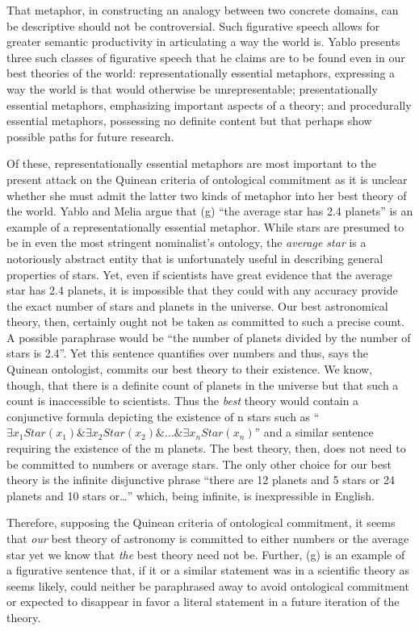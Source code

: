 \documentclass[12pt,letterpaper]{article}
\begin{document}
\begin{doublespace}
That metaphor, in constructing an analogy between two concrete
domains, can be descriptive should not be controversial.  Such
figurative speech allows for greater semantic productivity in
articulating a way the world is. Yablo presents three such classes of
figurative speech that he claims are to be found even in our best
theories of the world: representationally essential metaphors,
expressing a way the world is that would otherwise be unrepresentable;
presentationally essential metaphors, emphasizing important aspects of
a theory; and procedurally essential metaphors, possessing no definite
content but that perhaps show possible paths for future research.

Of these, representationally essential metaphors are most important to
the present attack on the Quinean criteria of ontological commitment
as it is unclear whether she must admit the latter two kinds of
metaphor into her best theory of the world.  Yablo and Melia argue
that (g) ``the average star has 2.4 planets'' is an example of a
representationally essential metaphor.  While stars are presumed to be
in even the most stringent nominalist's ontology, the \emph{average
  star} is a notoriously abstract entity that is unfortunately useful
in describing general properties of stars.  Yet, even if scientists
have great evidence that the average star has 2.4 planets, it is
impossible that they could with any accuracy provide the exact number
of stars and planets in the universe. Our best astronomical theory,
then, certainly ought not be taken as committed to such a precise
count. A possible paraphrase would be ``the number of planets divided
by the number of stars is 2.4''.  Yet this sentence quantifies over
numbers and thus, says the Quinean ontologist, commits our best theory
to their existence.  We know, though, that there is a definite count
of planets in the universe but that such a count is inaccessible to
scientists. Thus the \emph{best} theory would contain a conjunctive
formula depicting the existence of n stars such as ``$\exists
x_1Star(x_1) \& \exists x_2Star(x_2) \& \ldots \& \exists
x_nStar(x_n)$'' and a similar sentence requiring the existence of the
m planets. The best theory, then, does not need to be committed to
numbers or average stars.  The only other choice for our best theory
is the infinite disjunctive phrase ``there are 12 planets and 5 stars
or 24 planets and 10 stars or\ldots'' which, being infinite, is
inexpressible in English.  

Therefore, supposing the Quinean criteria of ontological commitment,
it seems that \emph{our} best theory of astronomy is committed to
either numbers or the average star yet we know that \emph{the} best
theory need not be. Further, (g) is an example of a figurative
sentence that, if it or a similar statement was in a scientific theory
as seems likely, could neither be paraphrased away to avoid
ontological commitment or expected to disappear in favor a literal
statement in a future iteration of the theory.


\end{doublespace}
\end{document}
